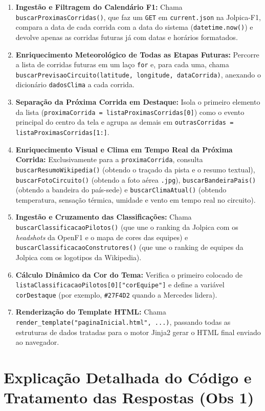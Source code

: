 \documentclass[12pt]{article}
\begin{document}
\begin{enumerate}
    \item \textbf{Ingestão e Filtragem do Calendário F1:} Chama \texttt{buscarProximasCorridas()}, que faz um \texttt{GET} em \texttt{current.json} na Jolpica-F1, compara a data de cada corrida com a data do sistema (\texttt{datetime.now()}) e devolve apenas as corridas futuras já com datas e horários formatados.
    \item \textbf{Enriquecimento Meteorológico de Todas as Etapas Futuras:} Percorre a lista de corridas futuras em um laço \texttt{for} e, para cada uma, chama \texttt{buscarPrevisaoCircuito(latitude, longitude, dataCorrida)}, anexando o dicionário \texttt{dadosClima} a cada corrida.
    \item \textbf{Separação da Próxima Corrida em Destaque:} Isola o primeiro elemento da lista (\texttt{proximaCorrida = listaProximasCorridas[0]}) como o evento principal do centro da tela e agrupa as demais em \texttt{outrasCorridas = listaProximasCorridas[1:]}.
    \item \textbf{Enriquecimento Visual e Clima em Tempo Real da Próxima Corrida:} Exclusivamente para a \texttt{proximaCorrida}, consulta \texttt{buscarResumoWikipedia()} (obtendo o traçado da pista e o resumo textual), \texttt{buscarFotoCircuito()} (obtendo a foto aérea \texttt{.jpg}), \texttt{buscarBandeiraPais()} (obtendo a bandeira do país-sede) e \texttt{buscarClimaAtual()} (obtendo temperatura, sensação térmica, umidade e vento em tempo real no circuito).
    \item \textbf{Ingestão e Cruzamento das Classificações:} Chama \texttt{buscarClassificacaoPilotos()} (que une o ranking da Jolpica com os \textit{headshots} da OpenF1 e o mapa de cores das equipes) e \texttt{buscarClassificacaoConstrutores()} (que une o ranking de equipes da Jolpica com os logotipos da Wikipedia).
    \item \textbf{Cálculo Dinâmico da Cor do Tema:} Verifica o primeiro colocado de \texttt{listaClassificacaoPilotos[0]["corEquipe"]} e define a variável \texttt{corDestaque} (por exemplo, \texttt{\#27F4D2} quando a Mercedes lidera).
    \item \textbf{Renderização do Template HTML:} Chama \texttt{render\_template("paginaInicial.html", ...)}, passando todas as estruturas de dados tratadas para o motor Jinja2 gerar o HTML final enviado ao navegador.
\end{enumerate}

\section{Explicação Detalhada do Código e Tratamento das Respostas (Obs 1)}
\end{document}

